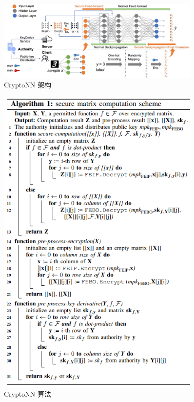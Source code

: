 \begin{figure}[htb]
\centering 
\includegraphics[width=0.90\textwidth]{img/ch3m5.png} 
\caption{CryptoNN 架构}
\label{Test}
\end{figure}

\begin{figure}[htb]
\centering 
\includegraphics[width=0.90\textwidth]{img/ch3m6.png} 
\caption{CryptoNN 算法}
\label{Test}
\end{figure}
